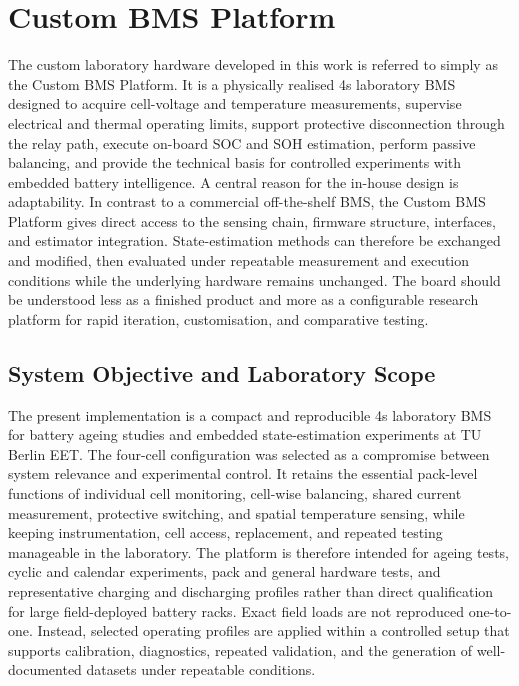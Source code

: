 \documentclass[
    a4paper,
    12pt,
    titlepage,
    bibliography=totoc,
    twoside=on,
    parskip=false,
    numbers=noenddot,
    cleardoublepage=empty,
    DIV=12,
    BCOR=12.0mm,
    headheight=36pt,
    headings=openright
]{scrreprt}
\begin{document}
\section{Custom BMS Platform}
The custom laboratory hardware developed in this work is referred to simply as the Custom BMS Platform. It is a physically realised 4s laboratory BMS designed to acquire cell-voltage and temperature measurements, supervise electrical and thermal operating limits, support protective disconnection through the relay path, execute on-board SOC and SOH estimation, perform passive balancing, and provide the technical basis for controlled experiments with embedded battery intelligence. A central reason for the in-house design is adaptability. In contrast to a commercial off-the-shelf BMS, the Custom BMS Platform gives direct access to the sensing chain, firmware structure, interfaces, and estimator integration. State-estimation methods can therefore be exchanged and modified, then evaluated under repeatable measurement and execution conditions while the underlying hardware remains unchanged. The board should be understood less as a finished product and more as a configurable research platform for rapid iteration, customisation, and comparative testing.

\subsection{System Objective and Laboratory Scope}
The present implementation is a compact and reproducible 4s laboratory BMS for battery ageing studies and embedded state-estimation experiments at TU Berlin EET. The four-cell configuration was selected as a compromise between system relevance and experimental control. It retains the essential pack-level functions of individual cell monitoring, cell-wise balancing, shared current measurement, protective switching, and spatial temperature sensing, while keeping instrumentation, cell access, replacement, and repeated testing manageable in the laboratory. The platform is therefore intended for ageing tests, cyclic and calendar experiments, pack and general hardware tests, and representative charging and discharging profiles rather than direct qualification for large field-deployed battery racks. Exact field loads are not reproduced one-to-one. Instead, selected operating profiles are applied within a controlled setup that supports calibration, diagnostics, repeated validation, and the generation of well-documented datasets under repeatable conditions.
\end{document}
